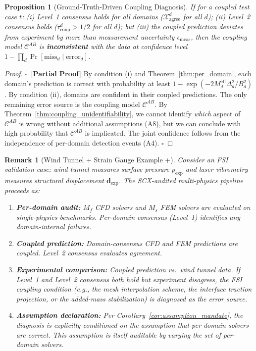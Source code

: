 \documentclass[11pt,a4paper]{article}
\newtheorem{proposition}[theorem]{Proposition}
\newtheorem{remark}[theorem]{Remark}
\theoremstyle{definition}
\newcommand{\rigorPartial}[0]{$\square$~\textbf{[Partial Proof]}}
\begin{document}
\begin{proposition}[Ground-Truth-Driven Coupling Diagnosis]\label{prop:gt_diagnosis}
If for a coupled test case $t$: (i) Level~1 consensus holds for all domains ($\mathcal{X}_{\mathrm{agree}}^d$ for all $d$); (ii) Level~2 consensus holds ($\tau_{\mathrm{coup}}^d > 1/2$ for all $d$); but (iii) the coupled prediction deviates from experiment by more than measurement uncertainty $\epsilon_{\mathrm{meas}}$, then the coupling model $\mathcal{C}^{AB}$ is \textbf{inconsistent} with the data at confidence level $1 - \prod_{d} \Pr[\text{miss}_d \mid \text{error}_d]$.
\end{proposition}

\begin{proof}\rigorPartial
By condition (i) and Theorem~\ref{thm:per_domain}, each domain's prediction is correct with probability at least $1 - \exp(-2 M_d^{\mathrm{eff}} \Delta_d^2 / B_d^2)$. By condition (ii), domains are confident in their coupled predictions. The only remaining error source is the coupling model $\mathcal{C}^{AB}$. By Theorem~\ref{thm:coupling_unidentifiability}, we cannot identify \textit{which} aspect of $\mathcal{C}^{AB}$ is wrong without additional assumptions (A8), but we can conclude with high probability that $\mathcal{C}^{AB}$ is implicated. The joint confidence follows from the independence of per-domain detection events (A4). $\square$
\end{proof}

\begin{remark}[Wind Tunnel + Strain Gauge Example +]\label{rem:wind_tunnel}
Consider an FSI validation case: wind tunnel measures surface pressure $p_{\mathrm{exp}}$ and laser vibrometry measures structural displacement $\mathbf{d}_{\mathrm{exp}}$. The SCX-audited multi-physics pipeline proceeds as:
\begin{enumerate}[label=(\roman*)]
    \item \textbf{Per-domain audit:} $M_f$ CFD solvers and $M_s$ FEM solvers are evaluated on single-physics benchmarks. Per-domain consensus (Level~1) identifies any domain-internal failures.
    \item \textbf{Coupled prediction:} Domain-consensus CFD and FEM predictions are coupled. Level~2 consensus evaluates agreement.
    \item \textbf{Experimental comparison:} Coupled prediction vs.\ wind tunnel data. If Level~1 and Level~2 consensus both hold but experiment disagrees, the FSI coupling condition (e.g., the mesh interpolation scheme, the interface traction projection, or the added-mass stabilization) is diagnosed as the error source.
    \item \textbf{Assumption declaration:} Per Corollary~\ref{cor:assumption_mandate}, the diagnosis is explicitly conditioned on the assumption that per-domain solvers are correct. This assumption is itself auditable by varying the set of per-domain solvers.
\end{enumerate}
\end{remark}
\end{document}
